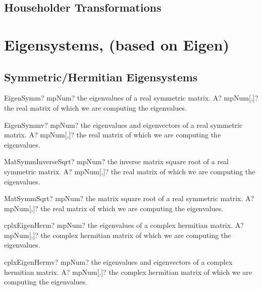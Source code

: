 \documentclass[12pt,a4paper,openany]{book}
\begin{document}
\section{Householder Transformations}

\chapter{Eigensystems, (based on Eigen)}

\section{Symmetric/Hermitian Eigensystems}

\begin{mpFunctionsExtract}
\mpFunctionOne
{EigenSymm? mpNum? the eigenvalues of a real symmetric matrix.}
{A? mpNum[,]? the real matrix of which we are computing the eigenvalues.}
\end{mpFunctionsExtract}

\begin{mpFunctionsExtract}
\mpFunctionOne
{EigenSymmv? mpNum? the eigenvalues and eigenvectors of a real symmetric matrix.}
{A? mpNum[,]? the real matrix of which we are computing the eigenvalues.}
\end{mpFunctionsExtract}

\begin{mpFunctionsExtract}
\mpFunctionOne
{MatSymmInverseSqrt? mpNum? the inverse matrix square root of a real symmetric matrix.}
{A? mpNum[,]? the real matrix of which we are computing the eigenvalues.}
\end{mpFunctionsExtract}

\begin{mpFunctionsExtract}
\mpFunctionOne
{MatSymmSqrt? mpNum? the matrix square root of a real symmetric matrix.}
{A? mpNum[,]? the real matrix of which we are computing the eigenvalues.}
\end{mpFunctionsExtract}

\begin{mpFunctionsExtract}
\mpFunctionOne
{cplxEigenHerm? mpNum? the eigenvalues of a complex hermitian matrix.}
{A? mpNum[,]? the complex hermitian  matrix of which we are computing the eigenvalues.}
\end{mpFunctionsExtract}

\begin{mpFunctionsExtract}
\mpFunctionOne
{cplxEigenHermv? mpNum? the eigenvalues and eigenvectors of a complex hermitian matrix.}
{A? mpNum[,]? the complex hermitian  matrix of which we are computing the eigenvalues.}
\end{mpFunctionsExtract}
\end{document}
